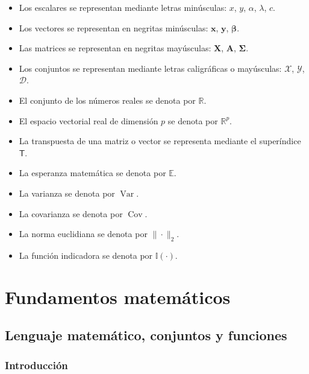 \documentclass[
  spanish,
  10.5pt,
  letterpaper,
  DIV=11,
  numbers=noendperiod,
  oneside,
  open=any]{scrreprt}
\providecommand{\tightlist}{%
  \setlength{\itemsep}{0pt}\setlength{\parskip}{0pt}}
\theoremstyle{definition}
\theoremstyle{definition}
\theoremstyle{plain}
\theoremstyle{remark}
\begin{document}
\begin{itemize}
\tightlist
\item
  Los escalares se representan mediante letras minúsculas: \(x\), \(y\),
  \(\alpha\), \(\lambda\), \(c\).
\item
  Los vectores se representan en negritas minúsculas: \(\mathbf{x}\),
  \(\mathbf{y}\), \(\boldsymbol{\beta}\).
\item
  Las matrices se representan en negritas mayúsculas: \(\mathbf{X}\),
  \(\mathbf{A}\), \(\boldsymbol{\Sigma}\).
\item
  Los conjuntos se representan mediante letras caligráficas o
  mayúsculas: \(\mathcal{X}\), \(\mathcal{Y}\), \(\mathcal{D}\).
\item
  El conjunto de los números reales se denota por \(\mathbb{R}\).
\item
  El espacio vectorial real de dimensión \(p\) se denota por
  \(\mathbb{R}^{p}\).
\item
  La transpuesta de una matriz o vector se representa mediante el
  superíndice \(\mathsf{T}\).
\item
  La esperanza matemática se denota por \(\mathbb{E}\).
\item
  La varianza se denota por \(\operatorname{Var}\).
\item
  La covarianza se denota por \(\operatorname{Cov}\).
\item
  La norma euclidiana se denota por \(\|\cdot\|_2\).
\item
  La función indicadora se denota por \(\mathbb{I}(\cdot)\).
\end{itemize}

\part{Fundamentos matemáticos}

\chapter{\texorpdfstring{Lenguaje matemático, conjuntos
y
funciones}{Lenguaje matemático, conjuntos y funciones}}\label{sec-conjuntos-funciones}

\section*{Introducción}\label{introducciuxf3n-1}

\end{document}
